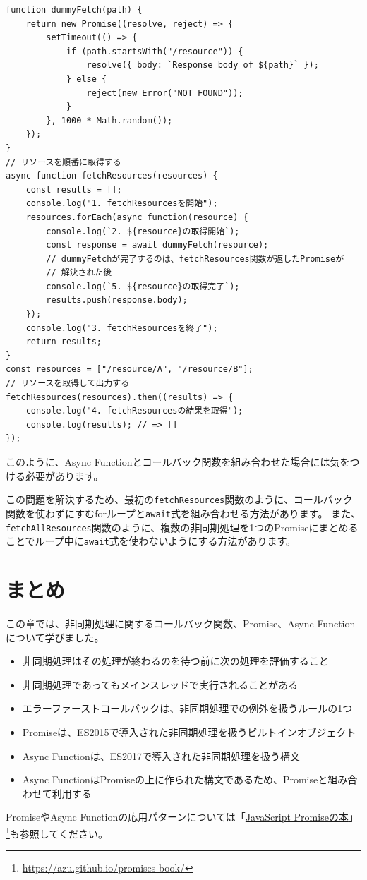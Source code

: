 \begin{lstlisting}
function dummyFetch(path) {
    return new Promise((resolve, reject) => {
        setTimeout(() => {
            if (path.startsWith("/resource")) {
                resolve({ body: `Response body of ${path}` });
            } else {
                reject(new Error("NOT FOUND"));
            }
        }, 1000 * Math.random());
    });
}
// リソースを順番に取得する
async function fetchResources(resources) {
    const results = [];
    console.log("1. fetchResourcesを開始");
    resources.forEach(async function(resource) {
        console.log(`2. ${resource}の取得開始`);
        const response = await dummyFetch(resource);
        // dummyFetchが完了するのは、fetchResources関数が返したPromiseが
        // 解決された後
        console.log(`5. ${resource}の取得完了`);
        results.push(response.body);
    });
    console.log("3. fetchResourcesを終了");
    return results;
}
const resources = ["/resource/A", "/resource/B"];
// リソースを取得して出力する
fetchResources(resources).then((results) => {
    console.log("4. fetchResourcesの結果を取得");
    console.log(results); // => []
});
\end{lstlisting}

このように、Async
Functionとコールバック関数を組み合わせた場合には気をつける必要があります。

この問題を解決するため、最初の\texttt{fetchResources}関数のように、コールバック関数を使わずにすむforループと\texttt{await}式を組み合わせる方法があります。
また、\texttt{fetchAllResources}関数のように、複数の非同期処理を1つのPromiseにまとめることでループ中に\texttt{await}式を使わないようにする方法があります。

\hypertarget{conclusion}{%
\section{まとめ}\label{conclusion}}

この章では、非同期処理に関するコールバック関数、Promise、Async
Functionについて学びました。

\begin{itemize}
\item
  非同期処理はその処理が終わるのを待つ前に次の処理を評価すること
\item
  非同期処理であってもメインスレッドで実行されることがある
\item
  エラーファーストコールバックは、非同期処理での例外を扱うルールの1つ
\item
  Promiseは、ES2015で導入された非同期処理を扱うビルトインオブジェクト
\item
  Async Functionは、ES2017で導入された非同期処理を扱う構文
\item
  Async
  FunctionはPromiseの上に作られた構文であるため、Promiseと組み合わせて利用する
\end{itemize}

PromiseやAsync
Functionの応用パターンについては「\href{https://azu.github.io/promises-book/}{JavaScript
Promiseの本}」\footnote{\url{https://azu.github.io/promises-book/}}も参照してください。
